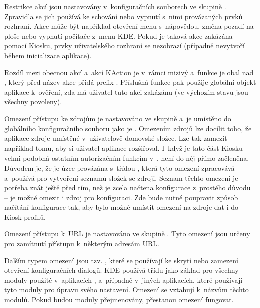 Restrikce akcí jsou nastavovány v~konfiguračních souborech ve skupině \linebreak{}. Zpravidla se jich používá ke schování nebo vypnutí s~nimi provázaných prvků rozhraní. Akce může být například otevření menu s~nápovědou, změna pozadí na ploše nebo vypnutí počítače z~menu KDE. Pokud je taková akce zakázána pomocí Kiosku, prvky uživatelského rozhraní se nezobrazí (případně nevytvoří během inicializace aplikace).

Rozdíl mezi obecnou akcí a~akcí KAction je v~rámci  mizivý a~funkce \linebreak{} je obal nad , který před název akce přidá prefix . Příslušná funkce pak použije globální  objekt aplikace k~ověření, zda má uživatel tuto akci zakázánu (ve výchozím stavu jsou všechny povoleny).

Omezení přístupu ke zdrojům je nastavováno ve skupině  a~je umístěno do globálního konfiguračního souboru jako je . Omezením zdrojů lze docílit toho, že aplikace  zdroje umístěné v~uživatelově domovské složce. Lze tak zamezit například tomu, aby si uživatel aplikace rozšiřoval. I~když je tato část Kiosku velmi podobná ostatním autorizačním funkcím v~, není do něj přímo začleněna. Důvodem je, že je úzce provázána s~třídou , která tyto omezení zpracovává a~používá pro vytvoření seznamů složek se zdroji. Seznam těchto omezení je potřeba znát ještě před tím, než je zcela načtena konfigurace z~prostého důvodu -- je možné omezit i zdroj pro konfiguraci. Zde bude nutné poupravit způsob načítání konfigurace tak, aby bylo možné umístit omezení na zdroje dat i do Kiosk profilů.

Omezení přístupu k~URL je nastavováno ve skupině . Tyto omezení jsou určeny pro zamítnutí přístupu k~některým adresám URL.

Dalším typem omezení jsou tzv. , které se používají ke skrytí nebo zamezení otevření konfiguračních dialogů. KDE používá třídu  jako základ pro všechny moduly použité v~aplikacích ,  a~případně v~jiných aplikacích, které používají tyto moduly pro úpravu svého nastavení. Omezení se vztahují k~názvům těchto modulů. Pokud budou moduly přejmenovány, přestanou omezení fungovat.

